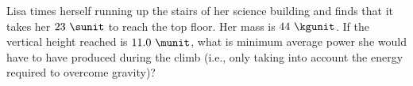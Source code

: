 Lisa times herself running up the stairs of her science building
and finds that it takes her $23\ \sunit$ to reach
the top floor. Her mass is $44\ \kgunit$. If the vertical
height reached is $11.0\ \munit$, what is minimum average power she would have to have
produced during the climb (i.e., only taking into account the energy
required to overcome gravity)?\answercheck
